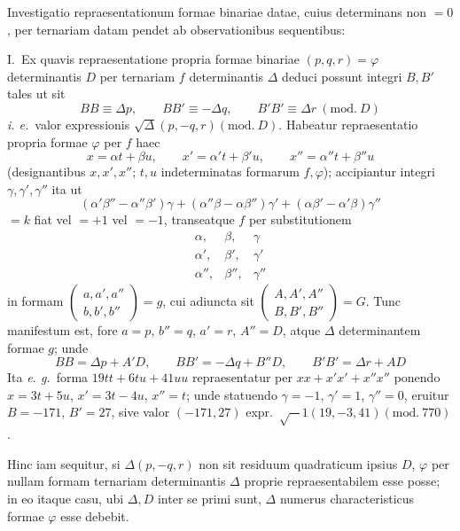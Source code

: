 Investigatio repraesentationum formae binariae datae, cuius determinans non $=0$,
per ternariam datam pendet ab observationibus sequentibus:

I.\ Ex quavis repraesentatione propria formae binariae $(p,q,r)=\varphi$
determinantis $D$ per ternariam $f$ determinantis $\Delta$ deduci possunt integri
$B,B'$ tales ut sit
\[
BB\equiv\Delta p,\qquad BB'\equiv-\Delta q,\qquad
B'B'\equiv\Delta r\ (\mathrm{mod.}\ D)
\]
\textit{i. e.}\ valor expressionis $\surd\Delta(p,\allowbreak -q,\allowbreak r)(\mathrm{mod.}\ D)$.
Habeatur repraesentatio propria formae $\varphi$ per $f$ haec
\[
x=\alpha t+\beta u,\qquad x'=\alpha't+\beta'u,\qquad x''=\alpha''t+\beta''u
\]
(designantibus $x,x',x''$; $t,u$ indeterminatas formarum $f,\varphi$); accipiantur
integri $\gamma,\gamma',\gamma''$ ita ut
\[
(\alpha'\beta''-\alpha''\beta')\gamma+
(\alpha''\beta-\alpha\beta'')\gamma'+
(\alpha\beta'-\alpha'\beta)\gamma''
\]
$=k$ fiat vel $=+1$ vel $=-1$, transeatque $f$ per substitutionem
\[
\begin{array}{ccc}
\alpha,&\beta,&\gamma\\
\alpha',&\beta',&\gamma'\\
\alpha'',&\beta'',&\gamma''
\end{array}
\]
in formam
$\left(\begin{smallmatrix}a,a',a''\\b,b',b''\end{smallmatrix}\right)=g$,
cui adiuncta sit
$\left(\begin{smallmatrix}A,A',A''\\B,B',B''\end{smallmatrix}\right)=G$.
Tunc manifestum est, fore $a=p$, $b''=q$, $a'=r$, $A''=D$, atque $\Delta$
determinantem formae $g$; unde
\[
BB=\Delta p+A'D,\qquad BB'=-\Delta q+B''D,\qquad B'B'=\Delta r+AD
\]
Ita \textit{e. g.}\ forma $19tt+6tu+41uu$ repraesentatur per $xx+x'x'+x''x''$
ponendo $x=3t+5u$, $x'=3t-4u$, $x''=t$; unde statuendo $\gamma=-1$,
$\gamma'=1$, $\gamma''=0$,
eruitur $B=-171$, $B'=27$, sive valor $(-171,27)$ expr.\
$\surd-1(19,\allowbreak -3,\allowbreak 41)(\mathrm{mod.}\ 770)$.

Hinc iam sequitur, si $\Delta(p,-q,r)$ non sit residuum quadraticum ipsius $D$,
$\varphi$ per nullam formam ternariam determinantis $\Delta$ proprie
repraesentabilem esse posse; in eo itaque casu, ubi $\Delta,D$ inter se primi
sunt, $\Delta$ numerus characteristicus formae $\varphi$ esse debebit.

